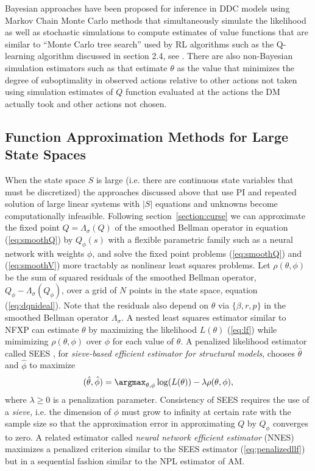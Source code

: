 Bayesian approaches have been proposed for inference in DDC models using Markov Chain Monte Carlo methods that simultaneously
simulate the likelihood as well as stochastic simulations to compute estimates of value functions that are similar to
``Monte Carlo tree search'' used by RL algorithms such as the Q-learning algorithm discussed in section 2.4, 
see \citet{ijc:2009}. There are also non-Bayesian simulation estimators such as
\citet{bbl:2007} that estimate $\theta$ as the value that minimizes the degree of suboptimality
in observed actions relative to other actions not taken  using simulation estimates of $Q$ function evaluated at the actions
the DM actually took and other actions not chosen.

\subsection{Function Approximation Methods for Large State Spaces}

When the state space $S$ is large (i.e. there are continuous state variables that must be discretized)
the approaches discussed above that use PI and repeated solution of 
large linear systems with $|S|$ equations and unknowns become computationally infeasible. 
Following section~\ref{section:curse} we can approximate 
the fixed point $Q=\Lambda_\sigma(Q)$ of the smoothed Bellman operator in equation (\ref{eq:smoothQ}) by $Q_\phi(s)$
with a flexible parametric family such as a neural network with weights $\phi$, and solve 
the fixed point problems (\ref{eq:smoothQ}) and (\ref{eq:smoothV}) more tractably as nonlinear least squares problems.  
Let $\rho(\theta,\phi)$ be the sum of squared residuals of the smoothed Bellman operator, $Q_\phi-\Lambda_\sigma(Q_\phi)$,
over a grid of $N$ points in the state space, equation (\ref{eq:dqnideal}). Note that the residuals also depend on $\theta$ via $\{\beta,r,p\}$
in the smoothed Bellman operator $\Lambda_\sigma$.
A nested least squares estimator similar to NFXP can estimate $\theta$ 
by maximizing the likelihood $L(\theta)$ (\ref{eq:lf}) while mimimizing $\rho(\theta,\phi)$ over $\phi$ for
each value of $\theta$. A penalized likelihood estimator called SEES \citep{LuoSang:2024}, for {\it sieve-based efficient estimator for
structural models\/}, chooses $\hat\theta$ and $\hat\phi$ to maximize 
\begin{equation}
(\hat\theta,\hat\phi)=\argmax_{\theta,\phi} \log(L(\theta))-\lambda \rho(\theta,\phi),
\label{eq:penalizedllf}
\end{equation}
where $\lambda \ge 0$ is a penalization parameter. Consistency of SEES requires the use of a {\it sieve,\/} i.e.
the dimension of $\phi$ must grow to infinity at certain rate with the sample
size so that the approximation error in approximating $Q$ by $Q_\phi$ converges to zero.
A related estimator called {\it neural network efficient estimator\/} (NNES) \citep{Nguyen:2025} maximizes a penalized criterion
similar to the SEES estimator (\ref{eq:penalizedllf}) but in a sequential fashion similar to the NPL
estimator of AM.

